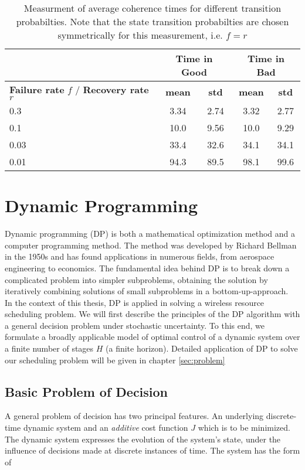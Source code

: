 \begin{table}[h]
  \begin{center}
  \begin{tabular}{|p{3.5cm}|c|c|c|c|}
  \hline 
  & \multicolumn{2}{|c|}{\textbf{Time in Good}} &
  \multicolumn{2}{|c|}{\textbf{Time in Bad}} \\
  \hline
  \textbf{Failure rate} $f$ / \textbf{Recovery rate} $r$ & \textbf{mean} & \textbf{std} & \textbf{mean}
  & \textbf{std}\\
  \hline \hline
  0.3 & 3.34 & 2.74 & 3.32 & 2.77 \\
  \hline 
  0.1 & 10.0 & 9.56 & 10.0 & 9.29 \\
  \hline 
  0.03 & 33.4 & 32.6 & 34.1 & 34.1 \\
  \hline 
  0.01 & 94.3 & 89.5 & 98.1 & 99.6 \\
  \hline 
  \end{tabular}
  \caption[Measurement of average coherence time]{Measurment of average coherence times for different transition probabilties. Note that the state transition
  probabilties are chosen symmetrically for this measurement, i.e. $f=r$}
  \label{tab:sojournTime}
  \end{center}
  \end{table}


\section{Dynamic Programming} \label{sec:DP}

Dynamic programming (DP) is both a mathematical optimization method and a
computer programming method. The method was developed by Richard Bellman in the
1950s and has found applications in numerous fields, from aerospace engineering
to economics. The fundamental idea behind DP is to break down a complicated
problem into simpler subproblems, obtaining the solution by iteratively
combining solutions of small subproblems in a bottom-up-approach. \\ In the
context of this thesis, DP is applied in solving a wireless resource scheduling
problem. We will first describe the principles of the DP algorithm with a
general decision problem under stochastic uncertainty. To this end, we formulate
a broadly applicable model of optimal control of a dynamic system over a finite
number of stages $H$ (a finite horizon). Detailed application of DP to solve our
scheduling problem will be given in chapter \ref{sec:problem}

\subsection*{Basic Problem of Decision}
A general problem of decision has two principal features. An underlying
discrete-time dynamic system and an \textit{additive} cost function $J$ which is
to be minimized. The dynamic system expresses the evolution of the system's
state, under the influence of decisions made at discrete instances of time. The
system has the form of

